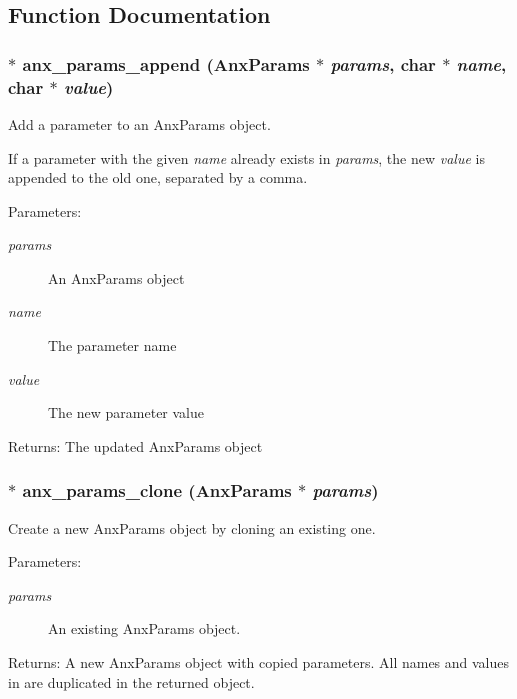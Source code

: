 


\subsection{Function Documentation}
\subsubsection{$\ast$ anx\_\-params\_\-append ({\bf Anx\-Params} $\ast$ {\em params}, char $\ast$ {\em name}, char $\ast$ {\em value})}\label{anx__params_8h_a9}


Add a parameter to an Anx\-Params object. 

If a parameter with the given {\em name\/} already exists in {\em params\/}, the new {\em value\/} is appended to the old one, separated by a comma. \begin{Desc}
\item[Parameters:]
\begin{description}
\item[{\em params}]An Anx\-Params object \item[{\em name}]The parameter name \item[{\em value}]The new parameter value \end{description}
\end{Desc}
\begin{Desc}
\item[Returns:]The updated Anx\-Params object \end{Desc}
\subsubsection{$\ast$ anx\_\-params\_\-clone ({\bf Anx\-Params} $\ast$ {\em params})}\label{anx__params_8h_a12}


Create a new Anx\-Params object by cloning an existing one. 

\begin{Desc}
\item[Parameters:]
\begin{description}
\item[{\em params}]An existing Anx\-Params object. \end{description}
\end{Desc}
\begin{Desc}
\item[Returns:]A new Anx\-Params object with copied parameters. All names and values in  are duplicated in the returned object. \end{Desc}
